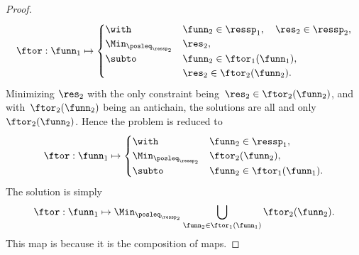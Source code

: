 \begin{proof}
\begin{equation}
\ftor:\funn_{1}\mapsto\begin{cases}
\with & \funn_{2}\in\ressp_{1},\quad\res_{2}\in\ressp_{2},\\
\Min_{\posleq_{\ressp_{2}}} & \res_{2},\\
\subto & \funn_{2}\in\ftor_{1}(\funn_{1}),\\
 & \res_{2}\in\ftor_{2}(\funn_{2}).
\end{cases}\label{eq:dede-2}
\end{equation}
Minimizing $\res_{2}$ with the only constraint being~$\res_{2}\in\ftor_{2}(\funn_{2})$,
and with~$\ftor_{2}(\funn_{2})$ being an antichain, the solutions
are all and only~$\ftor_{2}(\funn_{2})$. Hence the problem is reduced
to
\begin{equation}
\ftor:\funn_{1}\mapsto\begin{cases}
\with & \funn_{2}\in\ressp_{1},\\
\Min_{\posleq_{\ressp_{2}}} & \ftor_{2}(\funn_{2}),\\
\subto & \funn_{2}\in\ftor_{1}(\funn_{1}).
\end{cases}\label{eq:dede-2-1}
\end{equation}
The solution is simply
\begin{equation}
\ftor:\funn_{1}\mapsto\Min_{\posleq_{\ressp_{2}}}\bigcup_{\funn_{2}\in\ftor_{1}(\funn_{1})}\ftor_{2}(\funn_{2}).\label{eq:ora}
\end{equation}
This map is \scottcontinuous because it is the composition of \scottcontinuous
maps.
\end{proof}


